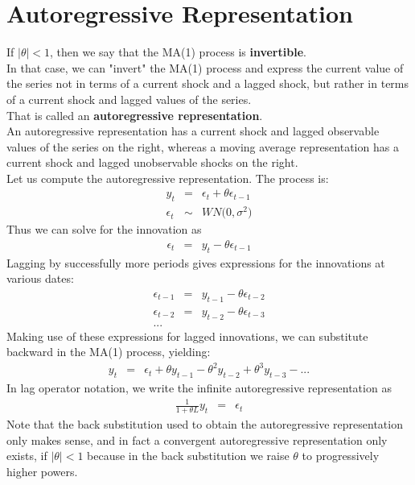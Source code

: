 \section{Autoregressive Representation}
If $\vert{\theta}\vert < 1$, then we say that the MA(1) process is \textbf{\color{blue}invertible}.\\
In that case, we can "invert" the MA(1) process and express the current value of the series not in terms of a current shock and a lagged shock, but rather in terms of a current shock and lagged values of the series.\\
That is called an \textbf{\color{blue}autoregressive representation}.\\
An autoregressive representation has a current shock and lagged observable values of the series on the right, whereas a moving average representation has a current shock and lagged unobservable shocks on the right.\\
Let us compute the autoregressive representation. The process is:
\begin{eqnarray}
y_{t} &=& \epsilon_{t} + \theta\epsilon_{t - 1}\\
\epsilon_{t} &\sim& WN\Big(0, \sigma^{2}\Big)
\end{eqnarray}
Thus we can solve for the innovation as
\begin{eqnarray}
\epsilon_{t} &=& y_{t} - \theta\epsilon_{t - 1}
\end{eqnarray}
Lagging by successfully more periods gives expressions for the innovations at various dates:
\begin{eqnarray}
\epsilon_{t - 1} &=& y_{t - 1} - \theta\epsilon_{t - 2}\\
\epsilon_{t - 2} &=& y_{t - 2} - \theta\epsilon_{t - 3}\\
... 
\end{eqnarray}
Making use of these expressions for lagged innovations, we can substitute backward in the MA(1) process, yielding:
\begin{eqnarray}
y_{t} &=& \epsilon_{t} + \theta y_{t - 1} - \theta^{2}y_{t - 2} + \theta^{3}y_{t - 3} - ...
\end{eqnarray}
In lag operator notation, we write the infinite autoregressive representation as
\begin{eqnarray}
\frac{1}{1 + \theta L}y_{t} &=& \epsilon_{t}
\end{eqnarray}
Note that the back substitution used to obtain the autoregressive representation only makes sense, and in fact a convergent autoregressive representation only exists, if $\vert\theta\vert < 1$ because in the back substitution we raise $\theta$ to progressively higher powers.\\
